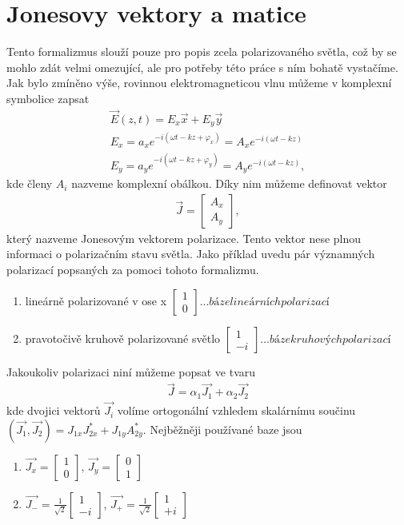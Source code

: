 \section{Jonesovy vektory a matice}
Tento formalizmus slouží pouze pro popis zcela polarizovaného světla, což by se mohlo zdát velmi omezující, ale pro potřeby této práce s ním bohatě vystačíme. Jak bylo zmíněno výše, rovinnou elektromagneticou vlnu můžeme v komplexní symbolice zapsat
\begin{eqnarray}
\vec{E}(z,t)=E_x\vec{x}+E_y\vec{y} \\
E_x=a_xe^{-i(\omega t-kz+\varphi_x)} \label{Ex}=A_xe^{-i(\omega t-kz)}\\
E_y=a_ye^{-i(\omega t-kz+\varphi_y)} \label{Ey}=A_ye^{-i(\omega t-kz)},
\end{eqnarray}
kde členy $A_i$ nazveme komplexní obálkou. Díky nim můžeme definovat vektor
\begin{eqnarray}
\vec{J}=\begin{bmatrix} A_x \\ A_y \end{bmatrix},
\end{eqnarray}
který nazveme Jonesovým vektorem polarizace. Tento vektor nese plnou informaci o polarizačním stavu světla. Jako příklad uvedu pár významných polarizací popsaných za pomoci tohoto formalizmu.
\begin{enumerate}
\item lineárně polarizované v ose x $\begin{bmatrix} 1 \\ 0 \end{bmatrix} \dots báze lineárních polarizací$
\item pravotočivě kruhově polarizované světlo $\begin{bmatrix} 1 \\ -i \end{bmatrix} \dots báze kruhových  polarizací$
\end{enumerate}
Jakoukoliv polarizaci niní můžeme popsat ve tvaru
\begin{eqnarray}
\vec{J}=\alpha_1\vec{J_1}+\alpha_2\vec{J_2}
\end{eqnarray}
kde dvojici vektorů $\vec{J_i}$ volíme ortogonální vzhledem skalárnímu součinu $(\vec{J_1},\vec{J_2})=J_{1x}J_{2x}^*+J_{1y}A_{2y}^*$. Nejběžněji používané  baze jsou
\begin{enumerate}
\item $\vec{J_x} = \begin{bmatrix} 1 \\ 0 \end{bmatrix}$, $\vec{J_y} = \begin{bmatrix} 0 \\ 1 \end{bmatrix}$
\item $\vec{J_-} =  \frac{1}{\sqrt{2}} \begin{bmatrix} 1 \\ -i \end{bmatrix}$, $\vec{J_+} = \frac{1}{\sqrt{2}} \begin{bmatrix} 1 \\ +i \end{bmatrix}$
\end{enumerate}
